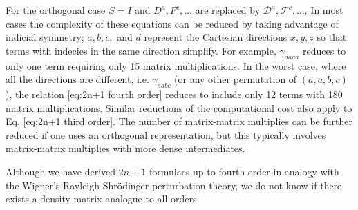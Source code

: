 \documentclass[prl,twocolumn,showpacs,twocolumngrid,superbib]{revtex4}
\def\F{\mathcal{F}}
\def\D{\mathcal{D}}
\begin{document}
For the orthogonal case $S=I$ and $D^a,F^c,\ldots$ are replaced by $\D^a,\F^c,\ldots$.
In most cases the complexity of these equations
can be reduced by taking advantage of indicial symmetry; 
$a,b,c,$ and $d$ represent the Cartesian directions $x,y,z$
so that terms with indecies in the same direction simplify. 
For example, $\gamma_{aaaa}$ reduces to only one term requiring only 15 matrix multiplications.
In the worst case, where all the directions are different, i.e. $\gamma_{aabc}$ 
(or any other permutation of $(a,a,b,c)$), the relation \eqref{eq:2n+1 fourth order} 
reduces to include only 12 terms with 180 matrix multiplications. 
Similar reductions of the computational cost also apply to 
Eq. \eqref{eq:2n+1 third order}. The number of matrix-matrix multiplies can be further reduced
if one uses an orthogonal representation, but this typically involves matrix-matrix multiplies 
with more dense intermediates.

Although we have derived $2n+1$ formulaes up to fourth order in analogy with 
the Wigner's Rayleigh-Shr\"odinger perturbation theory, we do not know if there exists a
density matrix analogue to all orders. 
\end{document}
